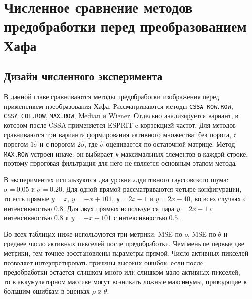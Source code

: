 \chapter{Численное сравнение методов предобработки перед преобразованием Хафа}

\section{Дизайн численного эксперимента}

В данной главе сравниваются методы предобработки изображения перед применением
преобразования Хафа. Рассматриваются методы \texttt{CSSA ROW.ROW}, \texttt{CSSA COL.ROW},
\texttt{MAX.ROW}, Median и Wiener. Отдельно анализируется вариант, в котором
после CSSA применяется ESPRIT c коррекцией частот.
Для методов сравниваются три варианта формирования активного множества: без
порога, с порогом $1\hat\sigma$ и с порогом $2\hat\sigma$, где $\hat\sigma$
оценивается по остаточной матрице. Метод \texttt{MAX.ROW} устроен иначе: он
выбирает $k$ максимальных элементов в каждой строке, поэтому пороговая
фильтрация для него не является основным этапом метода.

В экспериментах используются два уровня аддитивного гауссовского шума:
$\sigma=0.05$ и $\sigma=0.20$. Для одной прямой рассматриваются четыре
конфигурации, то есть прямые $y=x$, $y=-x+101$, $y=2x-1$ и $y=2x-40$,
во всех случаях с интенсивностью $0.8$. Для двух прямых используется пара
$y=2x-1$ с интенсивностью $0.8$ и $y=-x+101$ с интенсивностью $0.5$.

Во всех таблицах ниже используются три метрики: MSE по $\rho$, MSE по $\theta$
и среднее число активных пикселей после предобработки. Чем меньше первые две
метрики, тем точнее восстановлены параметры прямой. Число активных пикселей
позволяет интерпретировать причины высоких ошибок: если после предобработки
остается слишком много или слишком мало активных пикселей, то в
аккумуляторном массиве могут возникать ложные максимумы, приводящие к большим
ошибкам в оценках $\rho$ и $\theta$.

